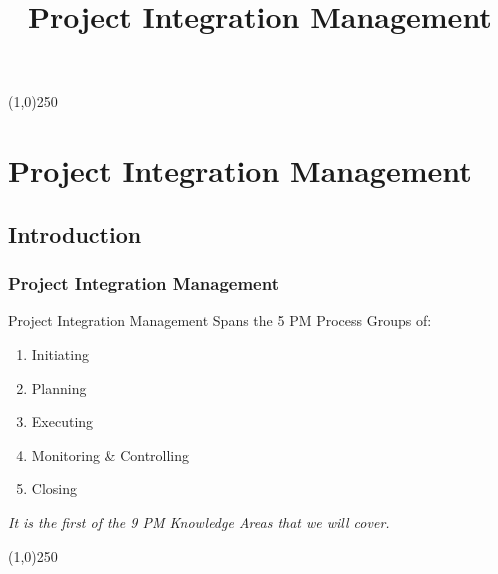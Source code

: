 

%
\title[Project Management \& BIM]{Project Integration Management}
%



%

\tableofcontents
\newpage



\begin{frame}
\titlepage
\end{frame}\begin{center}\line(1,0){250}\end{center}
%
%








\section{Project Integration Management}

\subsection{Introduction}








\begin{frame}
\frametitle{Project Integration Management}
Project Integration Management Spans the 5 PM Process Groups of:
\begin{enumerate}
	\item Initiating
	\item Planning
	\item Executing
	\item Monitoring \& Controlling
	\item Closing
\end{enumerate}
\textit{It is the first of the 9 PM Knowledge Areas that we will cover.}
\end{frame}\begin{center}\line(1,0){250}\end{center}
%
%


